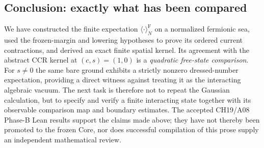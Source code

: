 \subsection{Conclusion: exactly what has been compared}

We have constructed the finite expectation
$\langle\cdot\rangle_N^{\mathrm F}$ on a normalized fermionic sea,
used the frozen-margin and lowering hypotheses to prove its ordered
current contractions, and derived an exact finite spatial kernel.
Its agreement with the abstract CCR kernel at $(c,s)=(1,0)$ is a
\emph{quadratic free-state comparison}.  For $s\ne0$ the same bare
ground exhibits a strictly nonzero dressed-number expectation,
providing a direct witness against treating it as the interacting
algebraic vacuum.  The next task is therefore not to repeat the
Gaussian calculation, but to specify and verify a finite interacting
state together with its observable comparison map and boundary
estimates.  The accepted CH19/A08 Phase-B Lean results support the
claims made above; they have not thereby been promoted to the frozen
Core, nor does successful compilation of this prose supply an
independent mathematical review.
